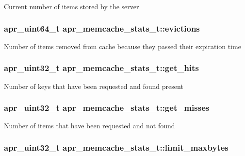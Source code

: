 Current number of items stored by the server \hypertarget{structapr__memcache__stats__t_ad430486ea11c0e5f7b70c9c2b95a216c}{
\subsubsection[{evictions}]{\setlength{\rightskip}{0pt plus 5cm}apr\-\_\-uint64\-\_\-t apr\-\_\-memcache\-\_\-stats\-\_\-t\-::evictions}}\label{structapr__memcache__stats__t_ad430486ea11c0e5f7b70c9c2b95a216c}
Number of items removed from cache because they passed their expiration time \hypertarget{structapr__memcache__stats__t_a6d3b60bc77c024259a2e9dfb1e35bfd7}{
\subsubsection[{get\-\_\-hits}]{\setlength{\rightskip}{0pt plus 5cm}apr\-\_\-uint32\-\_\-t apr\-\_\-memcache\-\_\-stats\-\_\-t\-::get\-\_\-hits}}\label{structapr__memcache__stats__t_a6d3b60bc77c024259a2e9dfb1e35bfd7}
Number of keys that have been requested and found present \hypertarget{structapr__memcache__stats__t_affaa2901db1db585fca3cfa77fcb0230}{
\subsubsection[{get\-\_\-misses}]{\setlength{\rightskip}{0pt plus 5cm}apr\-\_\-uint32\-\_\-t apr\-\_\-memcache\-\_\-stats\-\_\-t\-::get\-\_\-misses}}\label{structapr__memcache__stats__t_affaa2901db1db585fca3cfa77fcb0230}
Number of items that have been requested and not found \hypertarget{structapr__memcache__stats__t_afbfa184ab0898d4a897a629c935783b8}{
\subsubsection[{limit\-\_\-maxbytes}]{\setlength{\rightskip}{0pt plus 5cm}apr\-\_\-uint32\-\_\-t apr\-\_\-memcache\-\_\-stats\-\_\-t\-::limit\-\_\-maxbytes}}\label{structapr__memcache__stats__t_afbfa184ab0898d4a897a629c935783b8}
